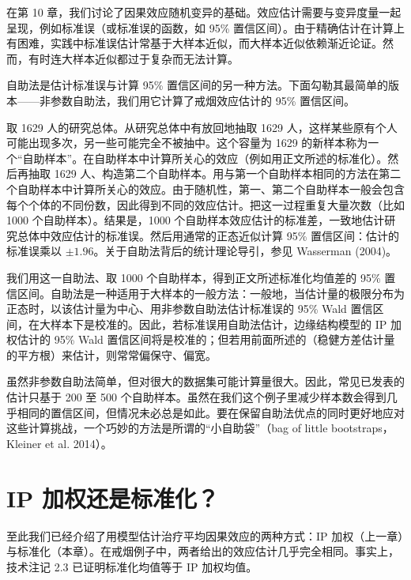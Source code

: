 \renewcommand{\TPname}{技术注记（Technical Point）}
\begin{techpoint}[自助法]
在第 10 章，我们讨论了因果效应随机变异的基础。效应估计需要与变异度量一起呈现，例如标准误（或标准误的函数，如 95\% 置信区间）。由于精确估计在计算上有困难，实践中标准误估计常基于大样本近似，而大样本近似依赖渐近论证。然而，有时连大样本近似都过于复杂而无法计算。

自助法是估计标准误与计算 95\% 置信区间的另一种方法。下面勾勒其最简单的版本——非参数自助法，我们用它计算了戒烟效应估计的 95\% 置信区间。

取 1629 人的研究总体。从研究总体中有放回地抽取 1629 人，这样某些原有个人可能出现多次，另一些可能完全不被抽中。这个容量为 1629 的新样本称为一个“自助样本”。在自助样本中计算所关心的效应（例如用正文所述的标准化）。然后再抽取 1629 人、构造第二个自助样本。用与第一个自助样本相同的方法在第二个自助样本中计算所关心的效应。由于随机性，第一、第二个自助样本一般会包含每个个体的不同份数，因此得到不同的效应估计。把这一过程重复大量次数（比如 1000 个自助样本）。结果是，1000 个自助样本效应估计的标准差，一致地估计研究总体中效应估计的标准误。然后用通常的正态近似计算 95\% 置信区间：估计的标准误乘以 $\pm 1.96$。关于自助法背后的统计理论导引，参见 Wasserman (2004)。

我们用这一自助法、取 1000 个自助样本，得到正文所述标准化均值差的 95\% 置信区间。自助法是一种适用于大样本的一般方法：一般地，当估计量的极限分布为正态时，以该估计量为中心、用非参数自助法估计标准误的 95\% Wald 置信区间，在大样本下是校准的。因此，若标准误用自助法估计，边缘结构模型的 IP 加权估计的 95\% Wald 置信区间将是校准的；但若用前面所述的（稳健方差估计量的平方根）来估计，则常常偏保守、偏宽。

虽然非参数自助法简单，但对很大的数据集可能计算量很大。因此，常见已发表的估计只基于 200 至 500 个自助样本。虽然在我们这个例子里减少样本数会得到几乎相同的置信区间，但情况未必总是如此。要在保留自助法优点的同时更好地应对这些计算挑战，一个巧妙的方法是所谓的“小自助袋”（bag of little bootstraps，Kleiner et al. 2014）。
\end{techpoint}
\renewcommand{\TPname}{技术注记}

\section{IP 加权还是标准化？}

至此我们已经介绍了用模型估计治疗平均因果效应的两种方式：IP 加权（上一章）与标准化（本章）。在戒烟例子中，两者给出的效应估计几乎完全相同。事实上，技术注记 2.3 已证明标准化均值等于 IP 加权均值。

